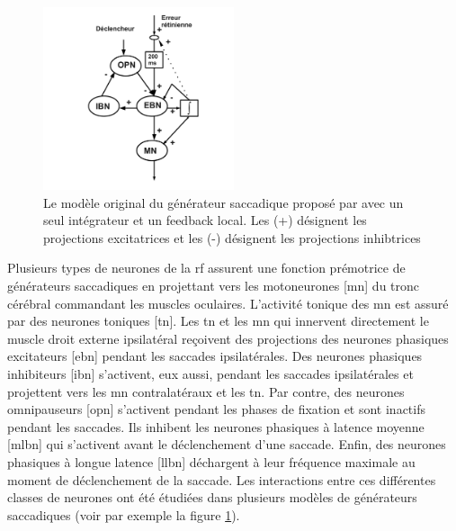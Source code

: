 \begin{figure}
\begin{center}
\includegraphics[width=0.5\textwidth]{figures/ch2_6_Robinson}
\end{center}
\caption{Le modèle original du générateur saccadique proposé par \cite{Robinson:1975} avec un seul intégrateur et un feedback local. Les (+) désignent les projections excitatrices et les (-) désignent les projections inhibtrices}
\label{robinson}
\end{figure}

Plusieurs types de neurones de la \gls{rf} assurent une fonction prémotrice de générateurs saccadiques \cite{Scudder:2002} en projettant vers les motoneurones [\gls{mn}] du tronc cérébral commandant les muscles oculaires. L'activité tonique des \gls{mn} est assuré par des neurones toniques [\gls{tn}]. Les \gls{tn} et les \gls{mn} qui innervent directement le muscle droit externe ipsilatéral reçoivent des projections des neurones phasiques excitateurs [\gls{ebn}] pendant les saccades ipsilatérales. Des neurones phasiques inhibiteurs [\gls{ibn}] s'activent, eux aussi, pendant les saccades ipsilatérales et projettent vers les \gls{mn} contralatéraux et les \gls{tn}. Par contre, des neurones omnipauseurs [\gls{opn}] s'activent pendant les phases de fixation et sont inactifs pendant les saccades. Ils inhibent les neurones phasiques à latence moyenne [\gls{mlbn}] qui s'activent avant le déclenchement d'une saccade. Enfin, des neurones phasiques à longue latence [\gls{llbn}] déchargent à leur fréquence maximale au moment de déclenchement de la saccade. Les interactions entre ces différentes classes de neurones ont été étudiées dans plusieurs modèles de générateurs saccadiques \cite{Robinson:1975,Tweed:1985,Scudder:1988,Quaia:1997} (voir par exemple la figure \ref{robinson}).






